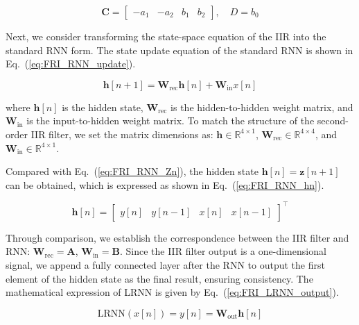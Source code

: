 \documentclass[journal]{IEEEtran}
\begin{document}
          \begin{equation}
              \mathbf{C} = \begin{bmatrix} -a_1 & -a_2 & b_1 & b_2 \end{bmatrix}, \quad D = b_0
              \label{eq:FRI_RNN_C_D}
          \end{equation}

          Next, we consider transforming the state-space equation of the IIR into the standard RNN form. The state update equation of the standard RNN is shown in Eq.~(\ref{eq:FRI_RNN_update}).

            \begin{equation}
              \mathbf{h}[n+1] = \mathbf{W}_{\text{rec}} \mathbf{h}[n] + \mathbf{W}_{\text{in}} x[n]
                \label{eq:FRI_RNN_update}
            \end{equation}

          where $ \mathbf{h}[n] $ is the hidden state, $ \mathbf{W}_{\text{rec}} $ is the hidden-to-hidden weight matrix, and $ \mathbf{W}_{\text{in}} $ is the input-to-hidden weight matrix. To match the structure of the second-order IIR filter, we set the matrix dimensions as: $ \mathbf{h} \in \mathbb{R}^{4 \times 1} $, $ \mathbf{W}_{\text{rec}} \in \mathbb{R}^{4 \times 4} $, and $ \mathbf{W}_{\text{in}} \in \mathbb{R}^{4 \times 1} $.

          
          Compared with Eq.~(\ref{eq:FRI_RNN_Zn}), the hidden state $ \mathbf{h}[n] = \mathbf{z}[n+1] $ can be obtained, which is expressed as shown in Eq.~(\ref{eq:FRI_RNN_hn}).


          \begin{equation}
              \mathbf{h}[n] = \begin{bmatrix} y[n] & y[n-1] & x[n] & x[n-1] \end{bmatrix}^\top
              \label{eq:FRI_RNN_hn}
          \end{equation}

          
          Through comparison, we establish the correspondence between the IIR filter and RNN: $\mathbf{W}_{\text{rec}} = \mathbf{A}$, $\mathbf{W}_{\text{in}} = \mathbf{B}$.
          Since the IIR filter output is a one-dimensional signal, we append a fully connected layer after the RNN to output the first element of the hidden state as the final result, ensuring consistency. The mathematical expression of LRNN is given by Eq.~(\ref{eq:FRI_LRNN_output}).

          \begin{equation}
              \mathrm{LRNN}(x[n]) = y[n] = \mathbf{W}_{\text{out}} \mathbf{h}[n]
              \label{eq:FRI_LRNN_output}
          \end{equation}
\end{document}

